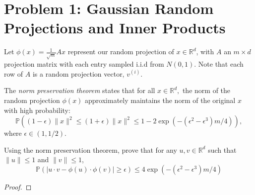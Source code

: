 \section*{Problem 1: Gaussian Random Projections and Inner Products}

Let $\phi(x) = \frac{1}{\sqrt{m}}Ax$ represent our random projection of
$x \in \mathbb{R}^d$, with $A$ an $m \times d$ projection matrix with each entry
sampled i.i.d from $N\left(0,1\right)$. Note that each row of $A$ is a random
projection vector, $v^{(i)}$.

The \emph{norm preservation theorem} states that for all $x \in \mathbb{R}^d,$
the norm of the random projection $\phi\left(x\right)$ approximately maintains
the norm of the original $x$ with high probability:
\begin{equation}
  \mathbb{P}\left(
    (1 - \epsilon) \lVert x \rVert^2 \leq \left(1 + \epsilon\right) \lVert x \rVert^2
    \leq 1 - 2\exp\left(-\left(\epsilon^2 - \epsilon^3\right)m/4\right)
  \right),
\end{equation}
where $\epsilon \in \left(1,1/2\right).$

Using the norm preservation theorem, prove that for any $u, v \in \mathbb{R}^d$
such that $\lVert u \rVert \leq 1$ and $\lVert v \rVert \leq 1$,
\begin{equation}
  \mathbb{P}\left(\lvert u \cdot v - \phi\left(u\right)\cdot\phi\left(v\right)\rvert \geq \epsilon\right) \leq 4\exp\left(
    -\left(\epsilon^2 - \epsilon^3\right)m/4
  \right)
\end{equation}

\begin{proof}
  
\end{proof}
